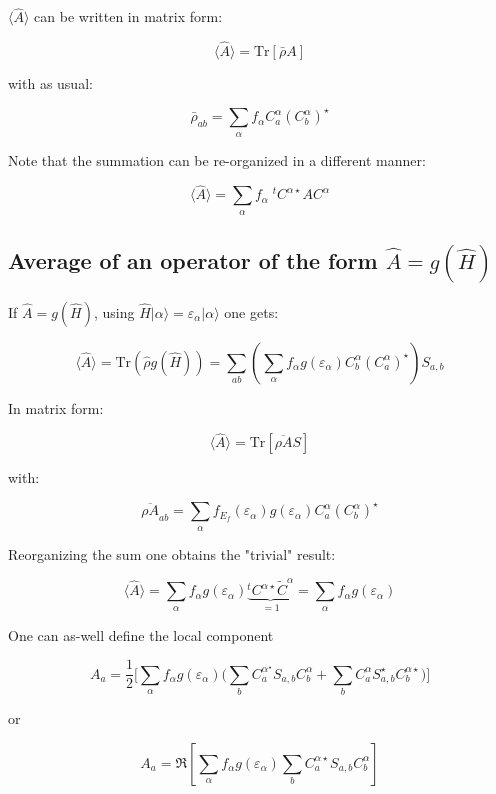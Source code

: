 \documentclass{article}
\newcommand{\ket}[1]{|#1\rangle}
\newcommand{\op}[1]{\hat{#1}}
\begin{document}
\noindent
$\langle\op{A}  \rangle$ can be written in matrix form:

\[  \langle\op{A}  \rangle= \text{Tr} \left[\bar{\rho}A\right] \]

\noindent
with as usual:

\[ \bar{\rho}_{a b}=  \sum_{\alpha}  f_{\alpha} C_{a }^{\alpha}(C_{b}^{\alpha})^{\star}    \]

\noindent
Note that the summation can be re-organized in a different manner:

\[\langle\op{A}  \rangle=\sum_{\alpha} f_{\alpha} \; ^tC^{\alpha \star} A C^{\alpha} \]

\subsection{Average of an operator of the form $\op{A}=g(\op{H})$}

\noindent
If $\op{A}=g(\op{H})$, using
$\op{H}\ket{\alpha}=\varepsilon_{\alpha}\ket{\alpha}$ 
one gets:


\[ \langle\op{A}  \rangle =\mbox{Tr} (\op{\rho} g(\op{H}))= 
\sum_{ a  b }\left(\sum_{\alpha}  f_{\alpha}g(\varepsilon_{\alpha})
 C_{b}^{\alpha}(C_{a}^{\alpha})^{\star} \right)  S_{a,b} \]


\noindent
In matrix form:

\[\langle\op{A}  \rangle = \mbox{Tr} \left[ \overline{\rho A}  S \right] \] 


\noindent
with:

\[ \overline{\rho A}_{ab}=\sum_{\alpha}  f_{E_f}(\varepsilon_{\alpha})g(\varepsilon_{\alpha})
 C_{a}^{\alpha}(C_{b}^{\alpha})^{\star}\]

\noindent
Reorganizing the sum one obtains the "trivial" result:

\[\langle\op{A}  \rangle =\sum_{\alpha } 
f_{\alpha} g(\varepsilon_{\alpha}) \underbrace{^tC^{\alpha \star}\widetilde{C}^{\alpha}}_{=1}=
\sum_{\alpha } 
f_{\alpha} g(\varepsilon_{\alpha}) \]

\noindent
One can as-well define the local component

\[ {A}_{a}=\frac{1}{2}\Bigg[\sum_{\alpha} 
f_{\alpha}g(\varepsilon_{\alpha}) 
\Bigg(\sum_{b} C_{a}^{\alpha^{\star}}S_{a,b}C_{b}^{\alpha} + \sum_{b} C_{a}^{\alpha}S_{a,b}^{\star}C_{b}^{\alpha \star}\Bigg) \Bigg]\]

\noindent
or

\[ {A}_{a }=\Re \left[ 
\sum_{\alpha}  f_{\alpha}g(\varepsilon_{\alpha}) 
\sum_{b} C_{a}^{\alpha \star} S_{a,b}C_{b}^{\alpha} \right] \]
\end{document}
